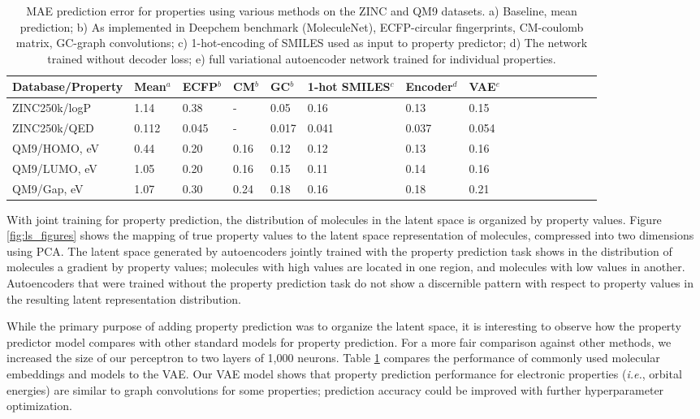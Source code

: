 \begin{table}[t]
\centering
\begin{tabular}{lp{1cm}lp{1cm}lp{1cm}lp{1cm}lp{1cm}lp{0.6cm}lp{1cm}lp{0.6cm}}
\hline
Database/Property & Mean$^{a}$   & ECFP$^{b}$    & CM$^{b}$ & GC$^{b}$ &  1-hot SMILES$^{c}$ & Encoder$^{d}$ & VAE$^{e}$   \\
\hline
ZINC250k/logP & 1.14 & 0.38 & - & 0.05 & 0.16 & 0.13 & 0.15 \\
ZINC250k/QED & 0.112 & 0.045 & - & 0.017 & 0.041 & 0.037 & 0.054 \\
QM9/HOMO, eV & 0.44 & 0.20 & 0.16 & 0.12 & 0.12 & 0.13 & 0.16  \\
QM9/LUMO, eV & 1.05 & 0.20 & 0.16 & 0.15 & 0.11 & 0.14 & 0.16  \\
QM9/Gap, eV & 1.07 & 0.30 & 0.24 & 0.18 & 0.16 & 0.18 & 0.21  \\
\hline
\end{tabular}
\caption{\small	MAE prediction error for  properties using various methods on the ZINC and QM9 datasets.
a) Baseline, mean prediction; b) As implemented in Deepchem benchmark (MoleculeNet)\cite{wu2017moleculenet}, ECFP-circular fingerprints, CM-coulomb matrix, GC-graph convolutions; c) 1-hot-encoding of SMILES used as input to property predictor; d) The network trained without decoder loss; e) full variational autoencoder network trained for individual properties.}
\label{tab:props_mae}
\end{table}

With joint training for property prediction, the distribution of molecules in the latent space is organized by property values. Figure \ref{fig:ls_figures} shows the mapping of true property values to the latent space representation of molecules, compressed into two dimensions using PCA. The latent space generated by autoencoders jointly trained with the property prediction task shows in the distribution of molecules a gradient by property values; molecules with high values are located in one region, and molecules with  low values in another. Autoencoders that were trained without the property prediction task do not show a discernible pattern with respect to property values in the resulting latent representation distribution.

While the primary purpose of adding property prediction was to organize the latent space, it is interesting to observe how the property predictor model compares with other standard models for property prediction. For a more fair comparison against other methods, we increased the size of our perceptron to two layers of 1,000 neurons. Table \ref{tab:props_mae} compares the performance of commonly used molecular embeddings and models to the VAE. Our VAE model shows that property prediction performance for electronic properties (\textit{i.e.}, orbital energies) are similar to graph convolutions for some properties; prediction accuracy could be improved with further hyperparameter optimization.

